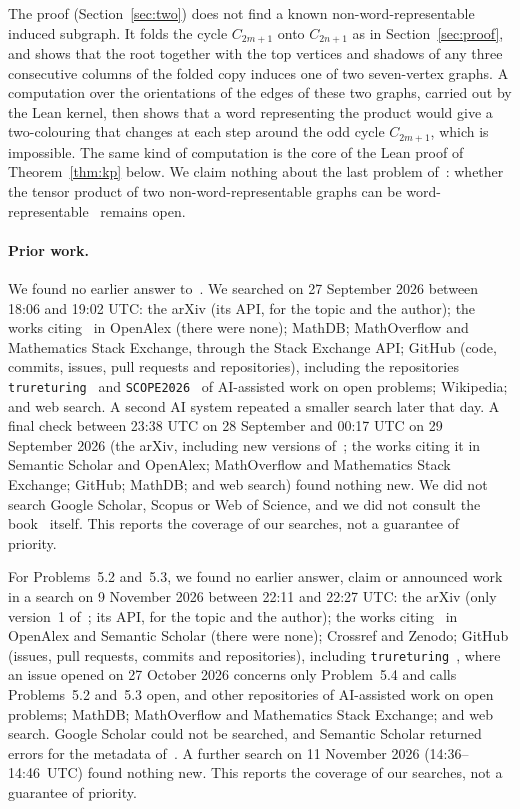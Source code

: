 \documentclass[11pt]{article}
\theoremstyle{remark}
\begin{document}
The proof (Section~\ref{sec:two}) does not find a known non-word-representable
induced subgraph. It folds the cycle $C_{2m+1}$ onto $C_{2n+1}$ as in
Section~\ref{sec:proof}, and shows that the root together with the top vertices and shadows of any three
consecutive columns of the folded copy induces one of two seven-vertex
graphs. A computation over the orientations of the edges of these two graphs,
carried out by the Lean kernel, then shows that a word representing the
product would give a two-colouring that changes at each step around the odd
cycle $C_{2m+1}$, which is impossible. The same kind of computation is the core
of the Lean proof of Theorem~\ref{thm:kp} below. We claim nothing about the last
problem of~\cite{alsh}: whether the tensor product of two
non-word-representable graphs can be word-representable~\cite[Problem~5.4]{alsh}
remains open.

\paragraph{Prior work.}
We found no earlier answer to~\cite[Problem~5.1]{alsh}. We searched on
27 September 2026 between 18:06 and 19:02 UTC: the arXiv (its API, for the
topic and the author); the works citing~\cite{alsh} in OpenAlex (there were
none); MathDB; MathOverflow and Mathematics Stack Exchange, through the Stack
Exchange API; GitHub (code, commits, issues, pull requests and
repositories), including the repositories \texttt{trureturing}~\cite{tru}
and \texttt{SCOPE2026}~\cite{scope} of AI-assisted work on open problems;
Wikipedia; and web search. A second AI system repeated a smaller search later
that day.
A final check between 23:38 UTC on 28 September and 00:17 UTC on
29 September 2026 (the arXiv, including new versions of~\cite{alsh}; the works
citing it in Semantic Scholar and OpenAlex; MathOverflow and Mathematics Stack
Exchange; GitHub; MathDB; and web search) found nothing new. We did not search Google
Scholar, Scopus or Web of Science, and we did not consult the book~\cite{kl}
itself. This reports the coverage of our searches, not a guarantee of
priority.

For Problems~5.2 and~5.3, we found no earlier answer, claim or announced work in a
search on 9 November 2026 between 22:11 and 22:27 UTC: the arXiv (only
version~1 of~\cite{alsh}; its API, for the topic and the author); the works
citing~\cite{alsh} in OpenAlex and Semantic Scholar (there were none);
Crossref and Zenodo; GitHub (issues, pull requests, commits and repositories),
including \texttt{trureturing}~\cite{tru}, where an issue opened on
27 October 2026 concerns only Problem~5.4 and calls Problems~5.2 and~5.3
open, and other repositories of AI-assisted work on open problems; MathDB;
MathOverflow and Mathematics Stack Exchange; and web search. Google Scholar
could not be searched, and Semantic Scholar returned errors for the metadata of~\cite{alsh}.
A further search on 11 November 2026 (14:36--14:46~UTC) found nothing new. This reports the coverage of our searches, not a guarantee of
priority.
\end{document}

